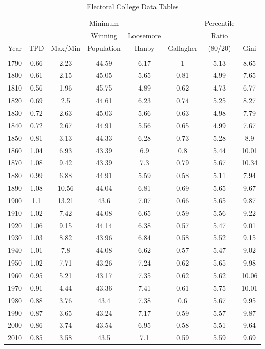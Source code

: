  

\begin{table}[!htbp] \centering 
  \caption{Electoral College Data Tables} 
  \label{tab:app_ec} 
\begin{tabular}{c|ccccccc}
 &  &  & Minimum &  &  & Percentile &  \\ 
  &   &   & Winning & Loosemore &  & Ratio &  \\ 
 Year & TPD & Max/Min & Population & Hanby & Gallagher & (80/20) & Gini \\ 
\hline \\[-1.8ex] 
1790 & 0.66 & 2.23 & 44.59 & 6.17 & 1 & 5.13 & 8.65 \\
1800 & 0.61 & 2.15 & 45.05 & 5.65 & 0.81 & 4.99 & 7.65 \\
1810 & 0.56 & 1.96 & 45.75 & 4.89 & 0.62 & 4.73 & 6.77 \\
1820 & 0.69 & 2.5 & 44.61 & 6.23 & 0.74 & 5.25 & 8.27 \\
1830 & 0.72 & 2.63 & 45.03 & 5.66 & 0.63 & 4.98 & 7.79 \\
1840 & 0.72 & 2.67 & 44.91 & 5.56 & 0.65 & 4.99 & 7.67 \\
1850 & 0.81 & 3.13 & 44.33 & 6.28 & 0.73 & 5.28 & 8.9 \\
1860 & 1.04 & 6.93 & 43.39 & 6.9 & 0.8 & 5.44 & 10.01 \\
1870 & 1.08 & 9.42 & 43.39 & 7.3 & 0.79 & 5.67 & 10.34 \\
1880 & 0.99 & 6.88 & 44.91 & 5.59 & 0.58 & 5.11 & 7.94 \\
1890 & 1.08 & 10.56 & 44.04 & 6.81 & 0.69 & 5.65 & 9.67 \\
1900 & 1.1 & 13.21 & 43.6 & 7.07 & 0.66 & 5.65 & 9.87 \\
1910 & 1.02 & 7.42 & 44.08 & 6.65 & 0.59 & 5.56 & 9.22 \\
1920 & 1.06 & 9.15 & 44.14 & 6.38 & 0.57 & 5.47 & 9.01 \\
1930 & 1.03 & 8.82 & 43.96 & 6.84 & 0.58 & 5.52 & 9.15 \\
1940 & 1.01 & 7.8 & 44.08 & 6.62 & 0.57 & 5.47 & 9.02 \\
1950 & 1.02 & 7.71 & 43.26 & 7.24 & 0.62 & 5.65 & 9.98 \\
1960 & 0.95 & 5.21 & 43.17 & 7.35 & 0.62 & 5.62 & 10.06 \\
1970 & 0.91 & 4.44 & 43.36 & 7.41 & 0.61 & 5.75 & 10.01 \\
1980 & 0.88 & 3.76 & 43.4 & 7.38 & 0.6 & 5.67 & 9.95 \\
1990 & 0.87 & 3.65 & 43.24 & 7.17 & 0.59 & 5.57 & 9.87 \\
2000 & 0.86 & 3.74 & 43.54 & 6.95 & 0.58 & 5.51 & 9.64 \\
2010 & 0.85 & 3.58 & 43.5 & 7.1 & 0.59 & 5.59 & 9.69 \\
\end{tabular}
\tabnotes{}
\end{table}

 
